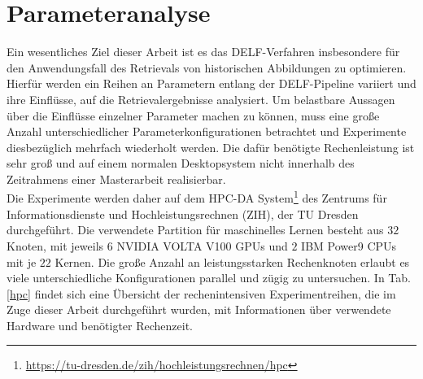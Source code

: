 \section{Parameteranalyse}

Ein wesentliches Ziel dieser Arbeit ist es das DELF-Verfahren insbesondere für den Anwendungsfall des Retrievals von historischen Abbildungen zu optimieren. Hierfür werden ein Reihen an Parametern entlang der DELF-Pipeline variiert und ihre Einflüsse, auf die Retrievalergebnisse analysiert. Um belastbare Aussagen über die Einflüsse einzelner Parameter machen zu können, muss eine große Anzahl unterschiedlicher Parameterkonfigurationen betrachtet und Experimente diesbezüglich mehrfach wiederholt werden. Die dafür benötigte Rechenleistung ist sehr groß und auf einem normalen Desktopsystem nicht innerhalb des Zeitrahmens einer Masterarbeit realisierbar.\\
Die Experimente werden daher auf dem HPC-DA System\footnote{\url{https://tu-dresden.de/zih/hochleistungsrechnen/hpc}} des Zentrums für Informationsdienste und Hochleistungsrechnen (ZIH), der TU Dresden durchgeführt. Die verwendete Partition für maschinelles Lernen besteht aus $32$ Knoten, mit jeweils $6$ NVIDIA VOLTA V100 GPUs und $2$ IBM Power9 CPUs mit je $22$ Kernen. Die große Anzahl an leistungsstarken Rechenknoten erlaubt es viele unterschiedliche Konfigurationen parallel und zügig zu untersuchen.
In Tab.\ref{hpc} findet sich eine Übersicht der rechenintensiven Experimentreihen, die im Zuge dieser Arbeit durchgeführt wurden, mit Informationen über verwendete Hardware und benötigter Rechenzeit.

